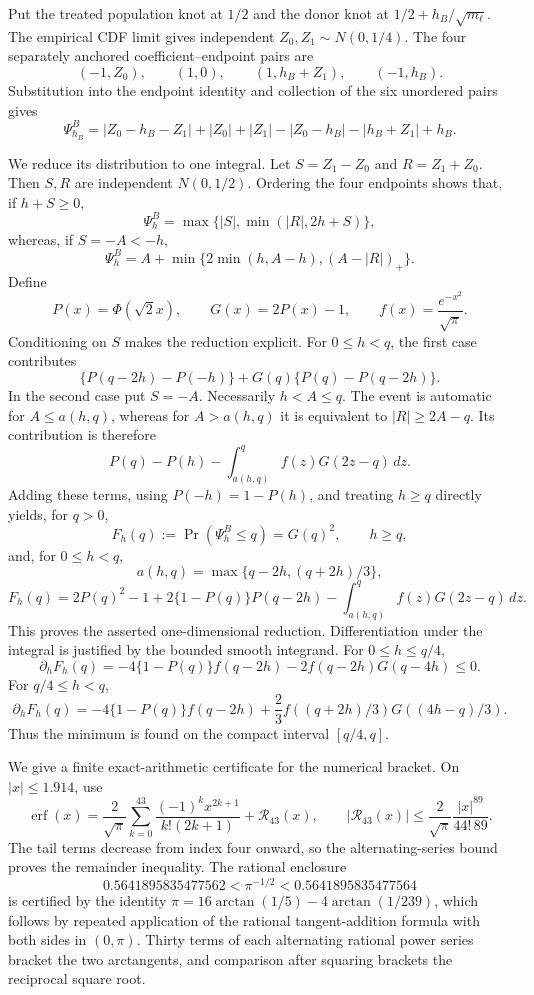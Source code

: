 Put the treated population knot at \(1/2\) and the donor knot at
\(1/2+h_B/\sqrt{m_\ell}\).  The empirical CDF limit gives independent
\(Z_0,Z_1\sim N(0,1/4)\).  The four separately anchored coefficient--endpoint pairs are
\[
 (-1,Z_0),\qquad(1,0),\qquad(1,h_B+Z_1),\qquad(-1,h_B).
\]
Substitution into the endpoint identity and collection of the six unordered pairs gives
\[
 \Psi^B_{h_B}=|Z_0-h_B-Z_1|+|Z_0|+|Z_1|
 -|Z_0-h_B|-|h_B+Z_1|+h_B.
\]

We reduce its distribution to one integral.  Let \(S=Z_1-Z_0\) and
\(R=Z_1+Z_0\).  Then \(S,R\) are independent \(N(0,1/2)\).  Ordering the four endpoints shows that, if \(h+S\geq0\),
\[
 \Psi^B_h=\max\{|S|,\min(|R|,2h+S)\},
\]
whereas, if \(S=-A<-h\),
\[
 \Psi^B_h=A+\min\{2\min(h,A-h),(A-|R|)_+\}.
\]
Define
\[
 P(x)=\Phi(\sqrt2x),\qquad G(x)=2P(x)-1,
 \qquad f(x)=\frac{e^{-x^2}}{\sqrt\pi}.
\]
Conditioning on \(S\) makes the reduction explicit.  For \(0\leq h<q\), the first case contributes
\[
 \{P(q-2h)-P(-h)\}+G(q)\{P(q)-P(q-2h)\}.
\]
In the second case put \(S=-A\).  Necessarily \(h<A\leq q\).  The event is automatic for \(A\leq a(h,q)\), whereas for
\(A>a(h,q)\) it is equivalent to \(|R|\geq2A-q\).  Its contribution is therefore
\[
 P(q)-P(h)-\int_{a(h,q)}^q f(z)G(2z-q)\,dz.
\]
Adding these terms, using \(P(-h)=1-P(h)\), and treating \(h\geq q\) directly yields, for \(q>0\),
\[
 F_h(q):=\Pr(\Psi^B_h\leq q)=G(q)^2,\qquad h\geq q,
\]
and, for \(0\leq h<q\),
\[
 a(h,q)=\max\{q-2h,(q+2h)/3\},
\]
\[
 F_h(q)=2P(q)^2-1+2\{1-P(q)\}P(q-2h)
 -\int_{a(h,q)}^q f(z)G(2z-q)\,dz. \tag{1}
\]
This proves the asserted one-dimensional reduction.  Differentiation under the integral is justified by the bounded smooth integrand.  For \(0\leq h\leq q/4\),
\[
 \partial_hF_h(q)=-4\{1-P(q)\}f(q-2h)
 -2f(q-2h)G(q-4h)\leq0.
\]
For \(q/4\leq h<q\),
\[
 \partial_hF_h(q)=-4\{1-P(q)\}f(q-2h)
 +\frac23f((q+2h)/3)G((4h-q)/3). \tag{2}
\]
Thus the minimum is found on the compact interval \([q/4,q]\).

We give a finite exact-arithmetic certificate for the numerical bracket.  On \(|x|\leq1.914\), use
\[
 \operatorname{erf}(x)=\frac2{\sqrt\pi}
 \sum_{k=0}^{43}\frac{(-1)^kx^{2k+1}}{k!(2k+1)}+\mathcal R_{43}(x),
 \qquad
 |\mathcal R_{43}(x)|\leq
 \frac2{\sqrt\pi}\frac{|x|^{89}}{44!\,89}.
\]
The tail terms decrease from index four onward, so the alternating-series bound proves the remainder inequality.  The rational enclosure
\[
 0.5641895835477562<\pi^{-1/2}<0.5641895835477564
\]
is certified by the identity
\(\pi=16\arctan(1/5)-4\arctan(1/239)\), which follows by repeated application of the rational tangent-addition formula with both sides in \((0,\pi)\).  Thirty terms of each alternating rational power series bracket the two arctangents, and comparison after squaring brackets the reciprocal square root.

